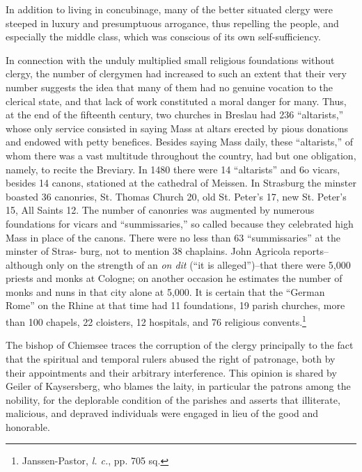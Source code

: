 In addition to living in concubinage, many of the better situated
clergy were steeped in luxury and presumptuous arrogance, thus repelling
the people, and especially the middle class, which was conscious
of its own self-sufficiency.

In connection with the unduly multiplied small religious foundations without
clergy, the number of clergymen had increased to
such an extent that their very number suggests the idea that many
of them had no genuine vocation to the clerical state, and that lack
of work constituted a moral danger for many. Thus, at the end
of the fifteenth century, two churches in Breslau had 236 “altarists,”
whose only service consisted in saying Mass at altars erected by pious
donations and endowed with petty benefices. Besides saying Mass
daily, these “altarists,” of whom there was a vast multitude throughout
the country, had but one obligation, namely, to recite the Breviary. In
1480 there were 14 “altarists” and 6o vicars, besides 14
canons, stationed at the cathedral of Meissen. In Strasburg the
minster boasted 36 canonries, St. Thomas Church 20, old St. Peter’s
17, new St. Peter’s 15, All Saints 12. The number of canonries was
augmented by numerous foundations for vicars and “summissaries,”
so called because they celebrated high Mass in place of the canons.
There were no less than 63 “summissaries” at the minster of Stras-
burg, not to mention 38 chaplains. John Agricola reports--although only
on the strength of an \textit{on dit} (“it is alleged”)--that
there were 5,000 priests and monks at Cologne; on another occasion
he estimates the number of monks and nuns in that city alone at
5,000. It is certain that the “German Rome” on the Rhine at that time
had 11 foundations, 19 parish churches, more than 100 chapels, 22
cloisters, 12 hospitals, and 76 religious convents.\footnote{Janssen-Pastor, \textit{l. c.}, pp. 705 sq.}

The bishop of Chiemsee traces the corruption of the clergy principally
to the fact that the spiritual and temporal rulers abused the
right of patronage, both by their appointments and their arbitrary
interference. This opinion is shared by Geiler of Kaysersberg, who
blames the laity, in particular the patrons among the nobility, for
the deplorable condition of the parishes and asserts that illiterate,
malicious, and depraved individuals were engaged in lieu of the good
and honorable.

